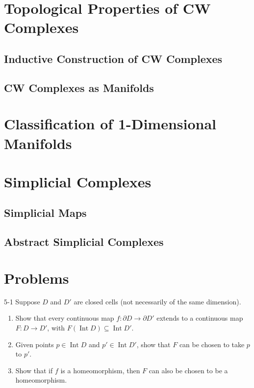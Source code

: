 \section{Topological Properties of CW Complexes}

\subsection{Inductive Construction of CW Complexes}

\subsection{CW Complexes as Manifolds}

\section{Classification of 1-Dimensional Manifolds}

\section{Simplicial Complexes}

\subsection{Simplicial Maps}

\subsection{Abstract Simplicial Complexes}

\section*{Problems}

\begin{problem}{5-1}\label{problem:5-1}
Suppose $D$ and $D'$ are closed cells (not necessarily of the same dimension).
\begin{enumerate}[label={(\alph*)}]
	\item Show that every continuous map $f: \partial D \to \partial D'$ extends to a continuous map $F: D \to D'$, with $F(\operatorname{Int} D) \subseteq \operatorname{Int} D'$.
	\item Given points $p \in \operatorname{Int} D$ and $p' \in \operatorname{Int} D'$, show that $F$ can be chosen to take $p$ to $p'$.
	\item Show that if $f$ is a homeomorphism, then $F$ can also be chosen to be a homeomorphism.
\end{enumerate}
\end{problem}

